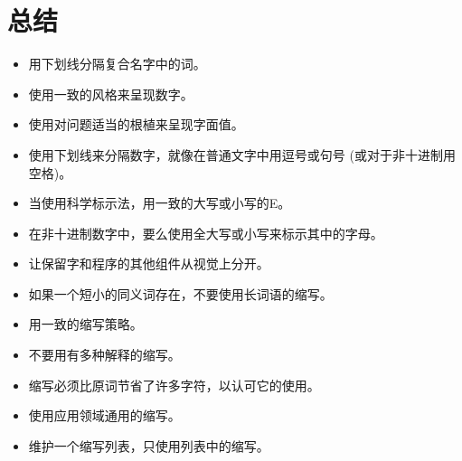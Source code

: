 \section{总结}
\noindent
\begin{itemize}
    \item 用下划线分隔复合名字中的词。
    \item 使用一致的风格来呈现数字。
    \item 使用对问题适当的根植来呈现字面值。
    \item 使用下划线来分隔数字，就像在普通文字中用逗号或句号
(或对于非十进制用空格)。
    \item 当使用科学标示法，用一致的大写或小写的E。
    \item 在非十进制数字中，要么使用全大写或小写来标示其中的字母。
    \item 让保留字和程序的其他组件从视觉上分开。
    \item 如果一个短小的同义词存在，不要使用长词语的缩写。
    \item 用一致的缩写策略。
    \item 不要用有多种解释的缩写。
    \item 缩写必须比原词节省了许多字符，以认可它的使用。
    \item 使用应用领域通用的缩写。
    \item 维护一个缩写列表，只使用列表中的缩写。
\end{itemize}

